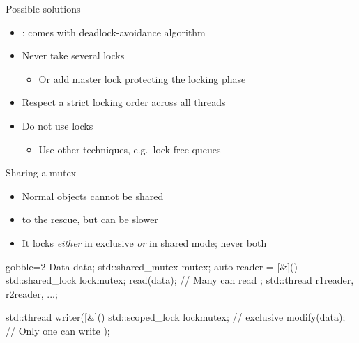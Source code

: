 \begin{frame}[fragile]
  \begin{block}{Possible solutions}
    \begin{itemize}
    \item {}:  comes with deadlock-avoidance algorithm
    \item Never take several locks
      \begin{itemize}
      \item Or add master lock protecting the locking phase
      \end{itemize}
    \item Respect a strict locking order across all threads
    \item Do not use locks
      \begin{itemize}
      \item Use other techniques, e.g.\ lock-free queues
      \end{itemize}
    \end{itemize}
  \end{block}
\end{frame}

\begin{frame}[fragile]
  \begin{block}{Sharing a mutex}
    \begin{itemize}
      \item Normal  objects cannot be shared
      \item {} to the rescue, but can be slower
      \item It locks \emph{either} in exclusive \emph{or} in shared mode; never both
    \end{itemize}
  \end{block}
  \begin{exampleblock}{}
    \begin{cppcode*}{gobble=2}
      Data data; std::shared_mutex mutex;
      auto reader = [&](){
        std::shared_lock lock{mutex};
        read(data); // Many can read
      };
      std::thread r1{reader}, r2{reader}, ...;

      std::thread writer([&](){
        std::scoped_lock lock{mutex}; // exclusive
        modify(data); // Only one can write
      });
    \end{cppcode*}
  \end{exampleblock}
\end{frame}
